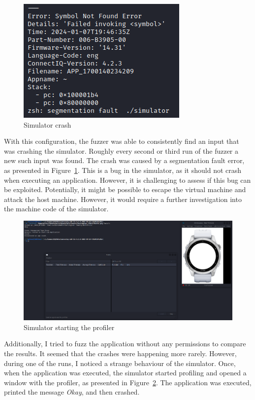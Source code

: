 \begin{figure}[h]
    \centering
    \includegraphics[width=0.4\linewidth]{../../images/simulator-crash}
    \caption{Simulator crash}
    \label{fig:simulator-crash}
\end{figure}

With this configuration, the fuzzer was able to consistently find an input that was crashing the simulator.
Roughly every second or third run of the fuzzer a new such input was found.
The crash was caused by a segmentation fault error, as presented in Figure~\ref{fig:simulator-crash}.
This is a bug in the simulator, as it should not crash when executing an application.
However, it is challenging to assess if this bug can be exploited.
Potentially, it might be possible to escape the virtual machine and attack the host machine.
However, it would require a further investigation into the machine code of the simulator.

\begin{figure}[h]
    \centering
    \includegraphics[width=1\linewidth]{../../images/simulator-bug-profiler}
    \caption{Simulator starting the profiler}
    \label{fig:simulator-bug-profiler}
\end{figure}

Additionally, I tried to fuzz the application without any permissions to compare the results.
It seemed that the crashes were happening more rarely.
However, during one of the runs, I noticed a strange behaviour of the simulator.
Once, when the application was executed, the simulator started profiling and opened a window with the profiler, as presented in Figure~\ref{fig:simulator-bug-profiler}.
The application was executed, printed the message \textit{Okay}, and then crashed.

